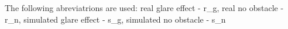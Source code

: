 The following abreviatrions are used: real glare effect - r\_g, real no obstacle - r\_n, simulated glare effect - s\_g, simulated no obstacle - s\_n

